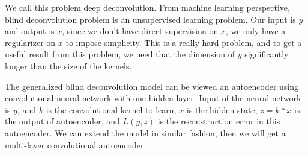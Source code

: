 \documentclass[12pt]{article}
\begin{document}
We call this problem deep deconvolution. From machine learning perspective,  blind deconvolution problem is an unsupervised learning problem. 
Our input is $y$ and output is $x$, since we don't have direct supervision on $x$, we only have a regularizer on $x$ to impose simplicity. 
This is a really hard problem, and to get a useful result from this problem, we need that the dimension of $y$ significantly longer than the size of the kernels. 

 
The generalized blind deconvolution model can be viewed an autoencoder using convolutional neural network with one hidden layer. 
Input of the neural network is $y$, and $k$ is the convolutional kernel to learn, $x$ is the hidden state, $z = k*x$ is the output of autoencoder, 
and $L(y,z)$ is the reconstruction error in this autoencoder. We can extend the model in similar fashion, then we will get a multi-layer convolutional autoencoder.

 





\end{document}
